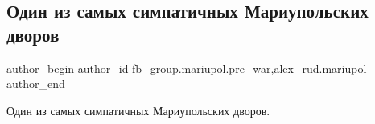  
 
 
 
 

\subsection{Один из самых симпатичных Мариупольских дворов}
\label{sec:11_02_2023.fb.fb_group.mariupol.pre_war.1.odin_iz_samikh_simpa}
 
\ifcmt
 author_begin
   author_id fb_group.mariupol.pre_war,alex_rud.mariupol
 author_end
\fi

Один из самых симпатичных Мариупольских дворов.

